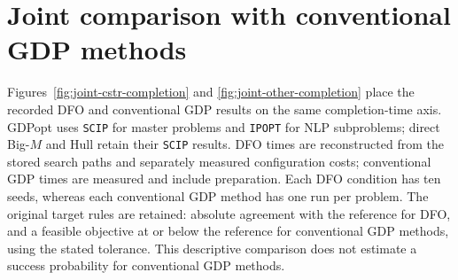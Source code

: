 \clearpage
\section{Joint comparison with conventional GDP methods}
\label{sec:supp-joint-comparison}
Figures~\ref{fig:joint-cstr-completion} and \ref{fig:joint-other-completion} place the recorded DFO and conventional GDP results on the same completion-time axis.
GDPopt uses \texttt{SCIP} for master problems and \texttt{IPOPT} for NLP subproblems; direct Big-\(M\) and Hull retain their \texttt{SCIP} results.
DFO times are reconstructed from the stored search paths and separately measured configuration costs; conventional GDP times are measured and include preparation.
Each DFO condition has ten seeds, whereas each conventional GDP method has one run per problem.
The original target rules are retained: absolute agreement with the reference for DFO, and a feasible objective at or below the reference for conventional GDP methods, using the stated tolerance.
This descriptive comparison does not estimate a success probability for conventional GDP methods.

